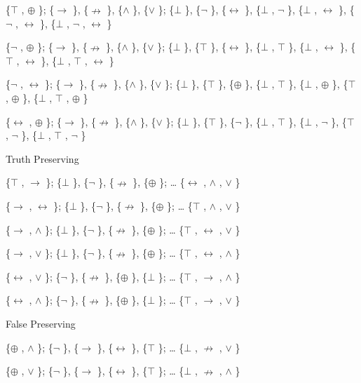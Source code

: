 \{$\top$ , $\oplus$ \}; \{$\to$ \}, \{$\nrightarrow$ \}, \{$\land$ \}, \{$\lor$ \}; \{$\bot$ \}, \{$\neg$ \}, \{$\leftrightarrow$ \}, \{$\bot$ , $\neg$ \},
\{$\bot$ , $\leftrightarrow$ \}, \{$\neg$ , $\leftrightarrow$ \}, \{$\bot$ , $\neg$ , $\leftrightarrow$ \}

\{$\neg$ , $\oplus$ \}; \{$\to$ \}, \{$\nrightarrow$ \}, \{$\land$ \}, \{$\lor$ \}; \{$\bot$ \}, \{$\top$ \}, \{$\leftrightarrow$ \}, \{$\bot$ , $\top$ \},
\{$\bot$ , $\leftrightarrow$ \}, \{$\top$ , $\leftrightarrow$ \}, \{$\bot$ , $\top$ , $\leftrightarrow$ \}

\{$\neg$ , $\leftrightarrow$ \}; \{$\to$ \}, \{$\nrightarrow$ \}, \{$\land$ \}, \{$\lor$ \}; \{$\bot$ \}, \{$\top$ \}, \{$\oplus$ \}, \{$\bot$ , $\top$ \},
\{$\bot$ , $\oplus$ \}, \{$\top$ , $\oplus$ \}, \{$\bot$ , $\top$ , $\oplus$ \}

\{$\leftrightarrow$ , $\oplus$ \}; \{$\to$ \}, \{$\nrightarrow$ \}, \{$\land$ \}, \{$\lor$ \}; \{$\bot$ \}, \{$\top$ \}, \{$\neg$ \}, \{$\bot$ , $\top$ \},
\{$\bot$ , $\neg$ \}, \{$\top$ , $\neg$ \}, \{$\bot$ , $\top$ , $\neg$ \}

\protect\hypertarget{anchor-10}{}{}Truth Preserving

\{$\top$ , $\to$ \}; \{$\bot$ \}, \{$\neg$ \}, \{$\nrightarrow$ \}, \{$\oplus$ \}; \ldots{} \{$\leftrightarrow$ , $\land$ , $\lor$ \}

\{$\to$ , $\leftrightarrow$ \}; \{$\bot$ \}, \{$\neg$ \}, \{$\nrightarrow$ \}, \{$\oplus$ \}; \ldots{} \{$\top$ , $\land$ , $\lor$ \}

\{$\to$ , $\land$ \}; \{$\bot$ \}, \{$\neg$ \}, \{$\nrightarrow$ \}, \{$\oplus$ \}; \ldots{} \{$\top$ , $\leftrightarrow$ , $\lor$ \}

\{$\to$ , $\lor$ \}; \{$\bot$ \}, \{$\neg$ \}, \{$\nrightarrow$ \}, \{$\oplus$ \}; \ldots{} \{$\top$ , $\leftrightarrow$ , $\land$ \}

\{$\leftrightarrow$ , $\lor$ \}; \{$\neg$ \}, \{$\nrightarrow$ \}, \{$\oplus$ \}, \{$\bot$ \}; \ldots{} \{$\top$ , $\to$ , $\land$ \}

\{$\leftrightarrow$ , $\land$ \}; \{$\neg$ \}, \{$\nrightarrow$ \}, \{$\oplus$ \}, \{$\bot$ \}; \ldots{} \{$\top$ , $\to$ , $\lor$ \}

\protect\hypertarget{anchor-11}{}{}False Preserving

\{$\oplus$ , $\land$ \}; \{$\neg$ \}, \{$\to$ \}, \{$\leftrightarrow$ \}, \{$\top$ \}; \ldots{} \{$\bot$ , $\nrightarrow$ , $\lor$ \}

\{$\oplus$ , $\lor$ \}; \{$\neg$ \}, \{$\to$ \}, \{$\leftrightarrow$ \}, \{$\top$ \}; \ldots{} \{$\bot$ , $\nrightarrow$ , $\land$ \}


